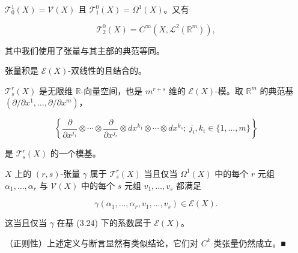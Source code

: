 \begin{remark}

\begin{items}
\item

$ \mathcal{T}_0^1(X) = \mathcal{V}(X) $ 且 $ \mathcal{T}_1^0(X) = \Omega^1(X) $。又有

\[
\mathcal{T}_2^0(X) = C^\infty(X, \mathcal{L}^2(\mathbb{R}^m)) ,
\]

其中我们使用了张量与其主部的典范等同。

\item

张量积是 $ \mathcal{E}(X) $-双线性的且结合的。

\item

$ \mathcal{T}_s^r(X) $ 是无限维 $ \mathbb{R} $-向量空间，也是 $ m^{r+s} $ 维的 $ \mathcal{E}(X) $-模。取 $ \mathbb{R}^m $ 的典范基 $ (\partial/\partial x^1, \ldots, \partial/\partial x^m) $，

\begin{equation}
\left\{ \frac{\partial}{\partial x^{j_1}} \otimes \cdots \otimes \frac{\partial}{\partial x^{j_r}} \otimes dx^{k_1} \otimes \cdots \otimes dx^{k_s} ;\ j_i, k_i \in \{1, \ldots, m\} \right\}\tag{3.24}
\end{equation}

是 $ \mathcal{T}_s^r(X) $ 的一个模基。

\item

$ X $ 上的 $ (r, s) $-张量 $ \gamma $ 属于 $ \mathcal{T}_s^r(X) $ 当且仅当 $ \Omega^1(X) $ 中的每个 $ r $ 元组 $ \alpha_1, \ldots, \alpha_r $ 与 $ \mathcal{V}(X) $ 中的每个 $ s $ 元组 $ v_1, \ldots, v_s $ 都满足

\[
\gamma(\alpha_1, \ldots, \alpha_r, v_1, \ldots, v_s) \in \mathcal{E}(X) .
\]

这当且仅当 $ \gamma $ 在基 (3.24) 下的系数属于 $ \mathcal{E}(X) $。

\item

（正则性）上述定义与断言显然有类似结论，它们对 $ C^k $ 类张量仍然成立。\nobreak\hspace{0.35em}■

\end{items}

\end{remark}

\exerciseshead

